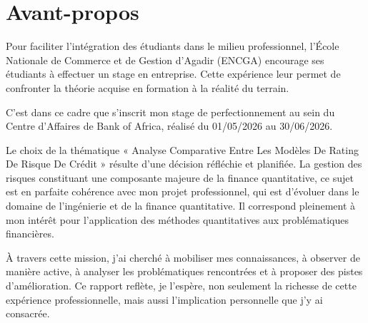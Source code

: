 \cleardoublepage
{}
{}
\chapter*{Avant-propos}



Pour faciliter l'intégration des étudiants dans le milieu professionnel, l'École Nationale de Commerce et de Gestion d'Agadir (ENCGA) encourage ses étudiants à effectuer un stage en entreprise. Cette expérience leur permet de confronter la théorie acquise en formation à la réalité du terrain.

C'est dans ce cadre que s'inscrit mon stage de perfectionnement au sein du Centre d'Affaires de Bank of Africa, réalisé du 01/05/2026 au 30/06/2026.

Le choix de la thématique « Analyse Comparative Entre Les Modèles De Rating De Risque De Crédit » résulte d'une décision réfléchie et planifiée. La gestion des risques constituant une composante majeure de la finance quantitative, ce sujet est en parfaite cohérence avec mon projet professionnel, qui est d'évoluer dans le domaine de l'ingénierie et de la finance quantitative. Il correspond pleinement à mon intérêt pour l'application des méthodes quantitatives aux problématiques financières.

À travers cette mission, j'ai cherché à mobiliser mes connaissances, à observer de manière active, à analyser les problématiques rencontrées et à proposer des pistes d'amélioration. Ce rapport reflète, je l'espère, non seulement la richesse de cette expérience professionnelle, mais aussi l'implication personnelle que j'y ai consacrée.